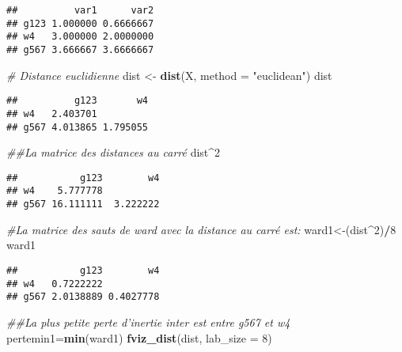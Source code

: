 \documentclass[
]{article}
\newenvironment{Shaded}{\begin{snugshade}}{\end{snugshade}}
\newcommand{\CommentTok}[1]{\textcolor[rgb]{0.56,0.35,0.01}{\textit{#1}}}
\newcommand{\DataTypeTok}[1]{\textcolor[rgb]{0.13,0.29,0.53}{#1}}
\newcommand{\DecValTok}[1]{\textcolor[rgb]{0.00,0.00,0.81}{#1}}
\newcommand{\KeywordTok}[1]{\textcolor[rgb]{0.13,0.29,0.53}{\textbf{#1}}}
\newcommand{\NormalTok}[1]{#1}
\newcommand{\OperatorTok}[1]{\textcolor[rgb]{0.81,0.36,0.00}{\textbf{#1}}}
\newcommand{\StringTok}[1]{\textcolor[rgb]{0.31,0.60,0.02}{#1}}
\begin{document}
\begin{verbatim}
##          var1      var2
## g123 1.000000 0.6666667
## w4   3.000000 2.0000000
## g567 3.666667 3.6666667
\end{verbatim}

\begin{Shaded}
\begin{Highlighting}[]
\CommentTok{# Distance euclidienne}
\NormalTok{dist <-}\StringTok{ }\KeywordTok{dist}\NormalTok{(X, }\DataTypeTok{method =} \StringTok{"euclidean"}\NormalTok{)}
\NormalTok{dist}
\end{Highlighting}
\end{Shaded}

\begin{verbatim}
##          g123       w4
## w4   2.403701         
## g567 4.013865 1.795055
\end{verbatim}

\begin{Shaded}
\begin{Highlighting}[]
\CommentTok{##La matrice des distances au carré}
\NormalTok{dist}\OperatorTok{^}\DecValTok{2}
\end{Highlighting}
\end{Shaded}

\begin{verbatim}
##           g123        w4
## w4    5.777778          
## g567 16.111111  3.222222
\end{verbatim}

\begin{Shaded}
\begin{Highlighting}[]
\CommentTok{#La matrice des sauts de ward avec la distance au carré est:}
\NormalTok{ward1<-(dist}\OperatorTok{^}\DecValTok{2}\NormalTok{)}\OperatorTok{/}\DecValTok{8}
\NormalTok{ward1}
\end{Highlighting}
\end{Shaded}

\begin{verbatim}
##           g123        w4
## w4   0.7222222          
## g567 2.0138889 0.4027778
\end{verbatim}

\begin{Shaded}
\begin{Highlighting}[]
\CommentTok{##La plus petite perte d'inertie inter est entre g567 et w4}
\NormalTok{pertemin1=}\KeywordTok{min}\NormalTok{(ward1)}
\KeywordTok{fviz_dist}\NormalTok{(dist, }\DataTypeTok{lab_size =} \DecValTok{8}\NormalTok{)}
\end{Highlighting}
\end{Shaded}
\end{document}
